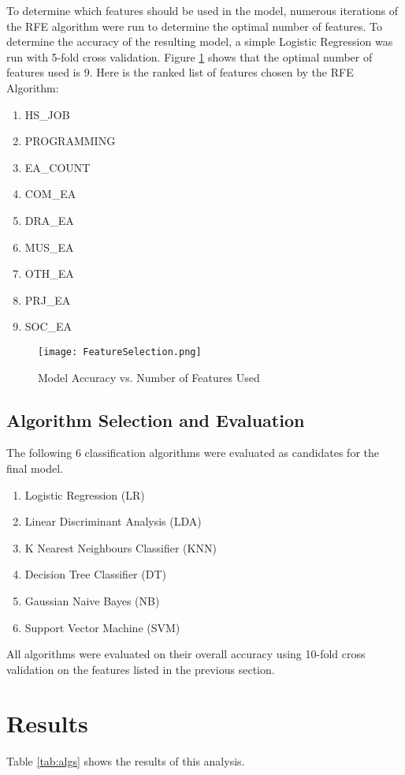 \documentclass{article}
\begin{document}
To determine which features should be used in the model, numerous iterations of the RFE algorithm were run to determine the optimal number of features. To determine the accuracy of the resulting model, a simple Logistic Regression was run with 5-fold cross validation. Figure \ref{fig:feature_selection} shows that the optimal number of features used is 9. Here is the ranked list of features chosen by the RFE Algorithm: 
\begin{enumerate}
	\item HS\_JOB
	\item PROGRAMMING
	\item EA\_COUNT
	\item COM\_EA
	\item DRA\_EA
	\item MUS\_EA
	\item OTH\_EA
	\item PRJ\_EA
	\item SOC\_EA
\end{enumerate}

\begin{figure}[h]
\texttt{[image: FeatureSelection.png]}\label{fig:feature_selection}
\caption{Model Accuracy vs. Number of Features Used}
\centering
\end{figure}

\subsection{Algorithm Selection and Evaluation}

The following 6 classification algorithms were evaluated as candidates for the final model. 
\begin{enumerate}
	\item Logistic Regression (LR)
	\item Linear Discriminant Analysis (LDA)
	\item K Nearest Neighbours Classifier (KNN)
	\item Decision Tree Classifier (DT)
	\item Gaussian Naive Bayes (NB)
	\item Support Vector Machine (SVM)
\end{enumerate}

All algorithms were evaluated on their overall accuracy using 10-fold cross validation on the features listed in the previous section. 
\section{Results}
Table \ref{tab:algs}  shows the results of this analysis. 
\end{document}

